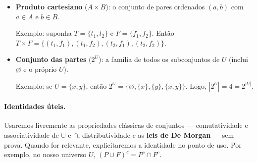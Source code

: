 \documentclass[12pt,a4paper]{article}
\begin{document}
\begin{itemize}
    \item \textbf{Produto cartesiano} (\(A\times B\)): o conjunto de pares ordenados \((a,b)\) com \(a\in A\) e \(b\in B\).

    Exemplo: suponha \(T=\{t_1,t_2\}\) e \(F=\{f_1,f_2\}\). Então
    \(T\times F = \{(t_1,f_1),(t_1,f_2),(t_2,f_1),(t_2,f_2)\}\).

    \item \textbf{Conjunto das partes} (\(2^U\)): a família de todos os subconjuntos de \(U\) (inclui \(\varnothing\) e o próprio \(U\)).
    
    Exemplo: se \(U = \{x,y\}\), então \(2^U = \{\varnothing, \{x\}, \{y\}, \{x,y\}\}\). Logo, \(|2^U|=4=2^{|U|}\).

\end{itemize}


\paragraph{Identidades úteis.}
Usaremos livremente as propriedades clássicas de conjuntos — comutatividade e associatividade de \(\cup\) e \(\cap\), distributividade e as \textbf{leis de De Morgan} — sem prova. Quando for relevante, explicitaremos a identidade no ponto de uso. Por exemplo, no nosso universo \(U\), \((P\cup F)^c = P^c\cap F^c\).

 




\printbibliography
\end{document}
